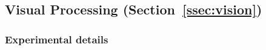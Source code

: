 \begin{table}
    \resizebox{\textwidth}{!}{%
    
    }
    \vskip 10pt
    \caption{Full results of mathematical problem-solving experiments. For each task, this table shows the mean test character-level accuracy $\pm$ the standard error of mean for each model configuration.}\label{tab:math_full_results}
\end{table}






\subsection{Visual Processing (Section~\ref{ssec:vision})}\label{ssec:appendix_vision}

\subsubsection*{Experimental details}

